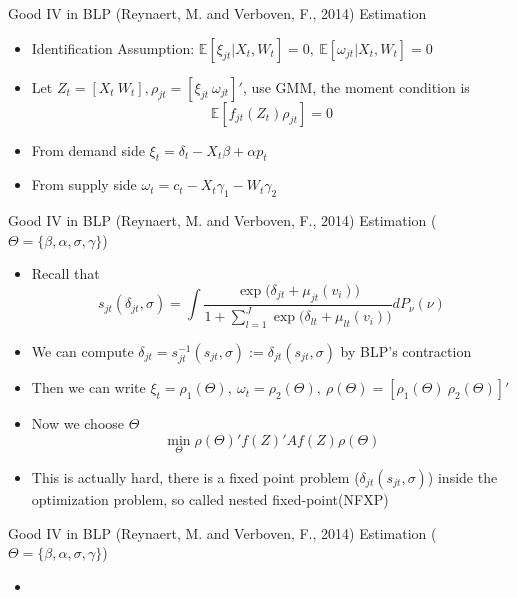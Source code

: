 \documentclass[10pt]{beamer}
\begin{document}
\begin{frame}{Good IV in BLP (Reynaert, M. and Verboven, F., 2014)}
Estimation
\begin{itemize}
	\item Identification Assumption: $\mathbb{E}[\xi_{jt}|X_t,W_t]=0,\ \mathbb{E}[\omega_{jt}|X_t,W_t]=0$ 
	\item Let $Z_t = [X_t\ W_t], \rho_{jt} = [\xi_{jt}\ \omega_{jt}]'$, use GMM, the moment condition is $$\mathbb{E}[f_{jt}(Z_t)\rho_{jt}]=0$$
	\item From demand side $\xi_t = \delta_t-X_t\beta +\alpha p_t$
	\item From supply side $\omega_t = c_t-X_t\gamma_1 -W_t\gamma_2$

\end{itemize}
\end{frame}

\begin{frame}{Good IV in BLP (Reynaert, M. and Verboven, F., 2014)}
Estimation ($\Theta=\{\beta,\alpha,\sigma, \gamma\}$)
\begin{itemize}
	\item Recall that$$s_{jt}(\delta_{jt},\sigma)=\int\frac{\exp\bigg(\delta_{jt}+\mu_{jt}(v_i)\bigg)}{1+\sum_{l=1}^J\exp\bigg(\delta_{lt}+\mu_{lt}(v_i)\bigg)}dP_\nu(\nu)$$
	\item We can compute $\delta_{jt} =s_{jt}^{−1}(s_{jt},\sigma):=\delta_{jt}(s_{jt},\sigma)$ by BLP's contraction
	\item Then we can write $\xi_t=\rho_1(\Theta),\ \omega_t =\rho_2(\Theta),\ \rho(\Theta)=[\rho_1(\Theta)\ \rho_2(\Theta)]' $
	\item Now we choose $\Theta$
	$$\min_{\Theta}\rho(\Theta)'f(Z)'Af(Z)\rho(\Theta)$$
	\item This is actually hard, there is a fixed point problem ($\delta_{jt}(s_{jt},\sigma)$) inside the optimization problem, so called nested fixed-point(NFXP)
\end{itemize}
\end{frame}

\begin{frame}{Good IV in BLP (Reynaert, M. and Verboven, F., 2014)}
Estimation ($\Theta=\{\beta,\alpha,\sigma, \gamma\}$)
\begin{itemize}
	\item 
\end{itemize}
\end{frame}
\end{document}
